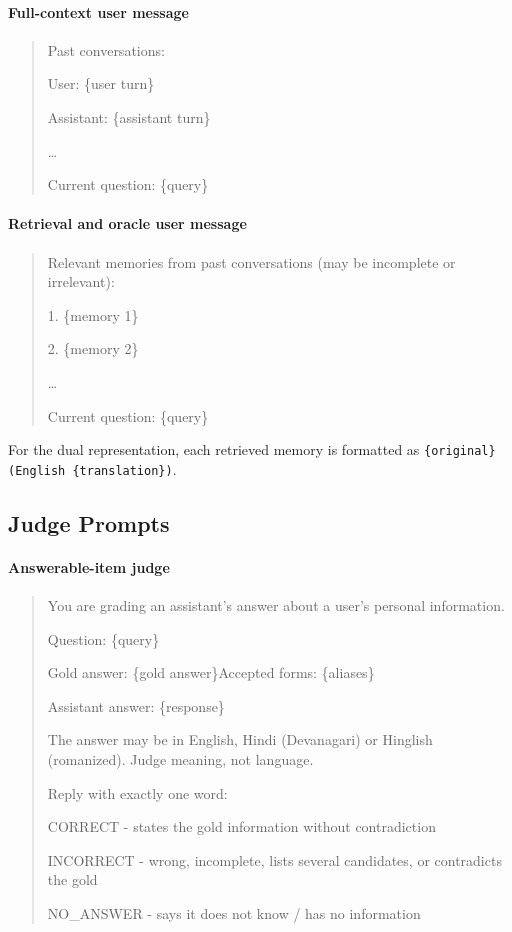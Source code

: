 \documentclass[11pt]{article}
\begin{document}
\paragraph*{Full-context user message}
\begin{quote}\footnotesize\ttfamily
Past conversations:\par
[Session 1]\par
User: \{user turn\}\par
Assistant: \{assistant turn\}\par
\ldots\par
Current question: \{query\}
\end{quote}

\paragraph*{Retrieval and oracle user message}
\begin{quote}\footnotesize\ttfamily
Relevant memories from past conversations (may be incomplete or irrelevant):\par
1. \{memory 1\}\par
2. \{memory 2\}\par
\ldots\par
Current question: \{query\}
\end{quote}
For the dual representation, each retrieved memory is formatted as \texttt{\{original\} (English \{translation\})}.

\subsection*{Judge Prompts}
\paragraph*{Answerable-item judge}
\begin{quote}\footnotesize\ttfamily
You are grading an assistant's answer about a user's personal information.\par
Question: \{query\}\par
Gold answer: \{gold answer\}\quad Accepted forms: \{aliases\}\par
Assistant answer: \{response\}\par
The answer may be in English, Hindi (Devanagari) or Hinglish (romanized). Judge meaning, not language.\par
Reply with exactly one word:\par
CORRECT - states the gold information without contradiction\par
INCORRECT - wrong, incomplete, lists several candidates, or contradicts the gold\par
NO\_ANSWER - says it does not know / has no information
\end{quote}
\end{document}

